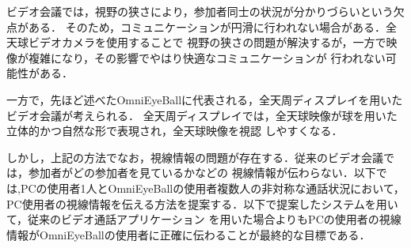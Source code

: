 



ビデオ会議では，視野の狭さにより，参加者同士の状況が分かりづらいという欠点がある．
そのため，コミュニケーションが円滑に行われない場合がある．全天球ビデオカメラを使用することで
視野の狭さの問題が解決するが，一方で映像が複雑になり，その影響でやはり快適なコミュニケーションが
行われない可能性がある．

一方で，先ほど述べたOmniEyeBallに代表される，全天周ディスプレイを用いたビデオ会議が考えられる．
全天周ディスプレイでは，全天球映像が球を用いた立体的かつ自然な形で表現され，全天球映像を視認
しやすくなる．

しかし，上記の方法でなお，視線情報の問題が存在する．従来のビデオ会議では，参加者がどの参加者を見ているかなどの
視線情報が伝わらない．以下では,PCの使用者1人とOmniEyeBallの使用者複数人の非対称な通話状況において，
PC使用者の視線情報を伝える方法を提案する．以下で提案したシステムを用いて，従来のビデオ通話アプリケーション
を用いた場合よりもPCの使用者の視線情報がOmniEyeBallの使用者に正確に伝わることが最終的な目標である．



